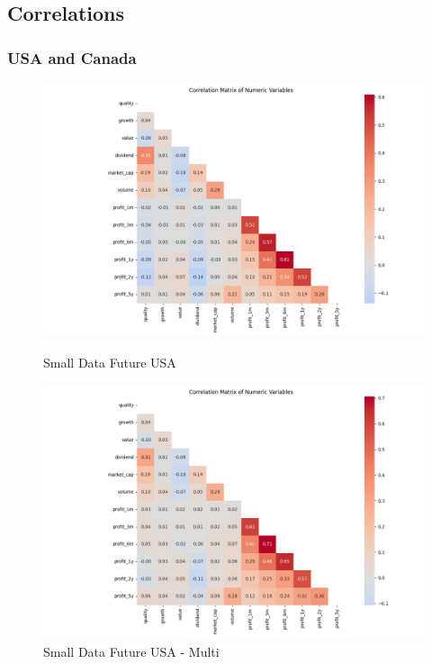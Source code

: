 \documentclass[11pt,english,a4paper,hidelinks]{book}
\begin{document}
\subsection{Correlations}

\subsubsection{USA and Canada}
\begin{figure}[H]
    \centering
    \begin{minipage}{0.48\textwidth}
        \centering
        \includegraphics[width=\linewidth]{images/code/descriptive analysis/correlations/Small Data future USA.png}
        \caption{Small Data Future USA}
        \label{fig:small_data_future_usa_correlations}
    \end{minipage}
    \begin{minipage}{0.48\textwidth}
        \centering
        \includegraphics[width=\linewidth]{images/code/descriptive analysis/correlations/Small Data future USA - Multi.png}
        \caption{Small Data Future USA - Multi}
        \label{fig:small_data_future_usa_multi_correlations}
    \end{minipage}
\end{figure}
\end{document}
